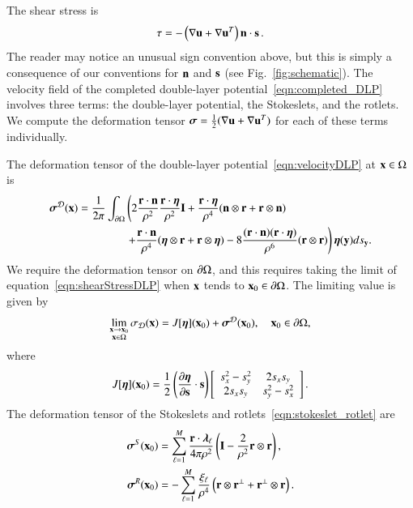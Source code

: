\documentclass[preprint, 10pt]{elsarticle}
\begin{document}
The shear stress is
\begin{align*}
  \tau = -\left(\nabla \uu + \nabla \uu^T \right)\nn \cdot \ss \, .
\end{align*}
The reader may notice an unusual sign convention above, but this is simply a consequence of our conventions for $\nn$ and $\ss$ (see Fig.~\ref{fig:schematic}). 
The velocity field of the
completed double-layer potential~\eqref{eqn:completed_DLP} involves
three terms: the double-layer potential, the Stokeslets, and the
rotlets.  We compute the deformation tensor $\ssigma =
\frac{1}{2}(\nabla\uu + \nabla\uu^T)$ for each of these terms
individually.

The deformation tensor of the double-layer
potential~\eqref{eqn:velocityDLP} at $\xx \in \Omega$
is~\cite{qua-bir2014a}
\begin{equation}
  \label{eqn:shearStressDLP}
  \begin{aligned}
  \ssigma^\DD(\xx) = \frac{1}{2\pi}\int_{\bd\Omega} &\left(
    2\frac{\rr \cdot \nn}{\rho^2} \frac{\rr \cdot \eeta}{\rho^2} \II + 
    \frac{\rr \cdot \eeta}{\rho^4} (\nn \otimes \rr + \rr \otimes \nn) 
    \right. \\
    &\left.
    +\frac{\rr \cdot \nn}{\rho^4} (\eeta \otimes \rr + \rr \otimes \eeta) - 
    8\frac{(\rr \cdot \nn)(\rr \cdot \eeta)}{\rho^6}(\rr \otimes \rr)
  \right) \eeta(\yy) ds_\yy.
  \end{aligned}
\end{equation}
We require the deformation tensor on $\bd\Omega$, and this requires
taking the limit of equation~\eqref{eqn:shearStressDLP} when $\xx$ tends
to $\xx_0 \in \bd\Omega$.  The limiting value is given by
\begin{align*}
  \lim_{\substack{\xx \rightarrow \xx_0 \\ \xx \in \Omega}}\sigma_\DD(\xx) =
  J[\eeta](\xx_0) + \ssigma^\DD(\xx_0), \quad \xx_0 \in \bd\Omega,
\end{align*} 
where
\begin{align}
  J[\eeta](\xx_0) = \frac{1}{2}\left(\pderiv{\eeta}{\ss} 
    \cdot \ss\right) \left[ 
  \begin{array}{cc}
    s_x^2 - s_y^2 & 2s_x s_y \\ 2s_x s_y & s_y^2 - s_x^2
  \end{array}\right].
  \label{eqn:shearStressJump}
\end{align}
The deformation tensor of the Stokeslets and
rotlets~\eqref{eqn:stokeslet_rotlet} are
\begin{equation}
  \label{eqn:shearStressSR}
  \begin{aligned}
  \ssigma^S(\xx_0) &= \sum_{\ell=1}^{M}
    \frac{\rr \cdot \llambda_\ell}{4\pi\rho^2} \left(
    \II - \frac{2}{\rho^2} \rr \otimes \rr \right),  \\
  \ssigma^R(\xx_0) &= -\sum_{\ell=1}^M
    \frac{\xi_\ell}{\rho^4} \left(\rr \otimes \rr^\perp + 
    \rr^\perp \otimes \rr \right).
  \end{aligned}
\end{equation}
\end{document}
